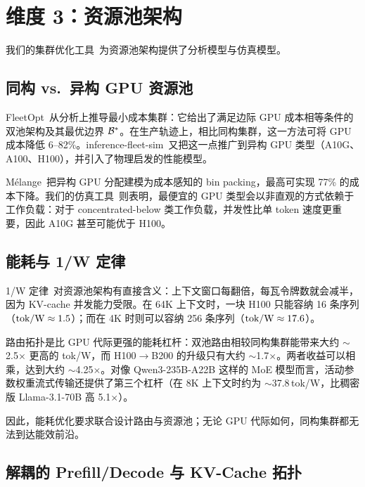 \section{维度 3：资源池架构}
\label{sec:pool}

我们的集群优化工具~\cite{fleetopt2026, fleetsim2026, onewlaw2026}为资源池架构提供了分析模型与仿真模型。

\subsection{同构 vs.\ 异构 GPU 资源池}
\label{sec:pool:homo-hetero}

FleetOpt~\cite{fleetopt2026}从分析上推导最小成本集群：它给出了满足边际 GPU 成本相等条件的双池架构及其最优边界 $\mathcal{B}^*$。在生产轨迹上，相比同构集群，这一方法可将 GPU 成本降低 6--82\%。inference-fleet-sim~\cite{fleetsim2026}又把这一点推广到异构 GPU 类型（A10G、A100、H100），并引入了物理启发的性能模型。

M\'{e}lange~\cite{griggs2024melange}把异构 GPU 分配建模为成本感知的 bin packing，最高可实现 77\% 的成本下降。我们的仿真工具~\cite{fleetsim2026}则表明，最便宜的 GPU 类型会以非直观的方式依赖于工作负载：对于 concentrated-below 类工作负载，并发性比单 token 速度更重要，因此 A10G 甚至可能优于 H100。

\subsection{能耗与 1/W 定律}
\label{sec:pool:energy}

1/W 定律~\cite{onewlaw2026}对资源池架构有直接含义：上下文窗口每翻倍，每瓦令牌数就会减半，因为 KV-cache 并发能力受限。在 64K 上下文时，一块 H100 只能容纳 16 条序列（$\operatorname{tok/W} \approx 1.5$）；而在 4K 时则可以容纳 256 条序列（$\operatorname{tok/W} \approx 17.6$）。

路由拓扑是比 GPU 代际更强的能耗杠杆：双池路由相较同构集群能带来大约 $\sim$2.5$\times$ 更高的 tok/W，而 H100$\to$B200 的升级只有大约 $\sim$1.7$\times$。两者收益可以相乘，达到大约 $\sim$4.25$\times$。对像 Qwen3-235B-A22B 这样的 MoE 模型而言，活动参数权重流式传输还提供了第三个杠杆（在 8K 上下文时约为 $\sim$37.8\,tok/W，比稠密版 Llama-3.1-70B 高 5.1$\times$）。

因此，能耗优化要求联合设计路由与资源池；无论 GPU 代际如何，同构集群都无法到达能效前沿。

\subsection{解耦的 Prefill/Decode 与 KV-Cache 拓扑}
\label{sec:pool:disagg}

